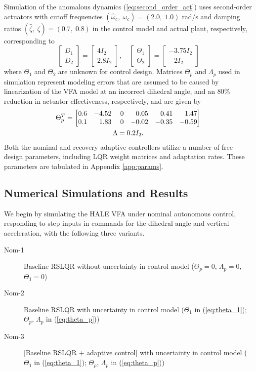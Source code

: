 Simulation of the anomalous dynamics (\ref{eq:second_order_act}) uses second-order actuators with cutoff frequencies $(\hat{\omega}_c,\; \omega_c) = (2.0 ,\; 1.0)$ rad/s and damping ratios $(\hat{\zeta},\; \zeta) = (0.7,\; 0.8)$ in the control model and actual plant, respectively, corresponding to
\begin{equation}
\begin{bmatrix}
	D_1 \\ D_2
\end{bmatrix} = \begin{bmatrix}
	4 I_2 \\ 2.8 I_2
\end{bmatrix}, \quad \begin{bmatrix}
	\Theta_1 \\ \Theta_2 
\end{bmatrix} = \begin{bmatrix}
	-3.75 I_2 \\ -2 I_2
\end{bmatrix}
\end{equation}
where $\Theta_1$ and $\Theta_2$ are unknown for control design. Matrices $\Theta_p$ and $\Lambda_p$ used in simulation represent modeling errors that are assumed to be caused by linearization of the VFA model at an incorrect dihedral angle, and an 80\% reduction in actuator effectiveness, respectively, and are given by
\begin{equation}
\begin{gathered}
\Theta_{p}^{T}=\begin{bmatrix}
0.6 & -4.52 & \; 0 & \hfill 0.05 & \hfill 0.41 & \hfill 1.47\\
0.1 & \hfill 1.83 & \; 0 & -0.02 & -0.35 & -0.59
\end{bmatrix}\\ \Lambda = 0.2 I_2. \end{gathered} \label{eq:theta_p}
\end{equation}
Both the nominal and recovery adaptive controllers utilize a number of free design parameters, including LQR weight matrices and adaptation rates. These parameters are tabulated in Appendix \ref{app:params}.


\subsection{Numerical Simulations and Results} \label{subsec:sims}
We begin by simulating the HALE VFA under nominal autonomous control, responding to step inputs in commands for the dihedral angle and vertical acceleration, with the following three variants.
\begin{description}
	\item[Nom-1] Baseline RSLQR without uncertainty in control model ($\Theta_p = 0$, $\Lambda_p = 0$, $\Theta_1 = 0$)
	\item[Nom-2] Baseline RSLQR with uncertainty in control model ($\Theta_1$ in (\ref{eq:theta_1}); $\Theta_p$, $\Lambda_p$ in (\ref{eq:theta_p}))
	\item[Nom-3] [Baseline RSLQR + adaptive control] with uncertainty in control model ($\Theta_1$ in (\ref{eq:theta_1}); $\Theta_p$, $\Lambda_p$ in (\ref{eq:theta_p}))
\end{description}

